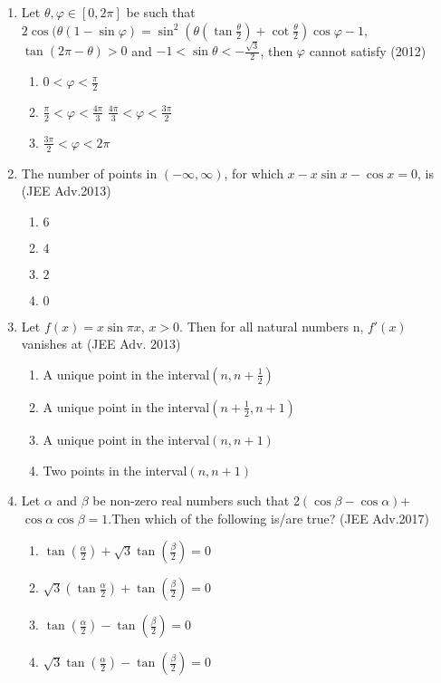 \documentclass[journal,12pt,twocolumn]{IEEEtran}
\theoremstyle{remark}
\begin{document}
\begin{enumerate}
\item Let $\theta, \varphi \in [0,2\pi]$ be such that $2 \cos(\theta(1-\sin \varphi)= 
\sin^2(\theta(\tan\frac{\theta}{2})+\cot\frac{\theta}{2})\cos \varphi-1$,$\tan(2\pi-\theta)>0$ and $-1<\sin{\theta}<-\frac{\sqrt{3}}{2}$, then $\varphi$ cannot satisfy \hfill(2012)
\begin{enumerate}
    \item $0<\varphi<\frac{\pi}{2}$
    \item $\frac{\pi}{2}<\varphi<\frac{4\pi}{3}$
    \iem $\frac{4\pi}{3}<\varphi<\frac{3\pi}{2}$
    \item $\frac{3\pi}{2}<\varphi<2\pi$
\end{enumerate}
\item The number of points in $(-\infty, \infty)$, for which $x - x \sin x - \cos x = 0$, is \hfill(JEE Adv.2013)
\begin{enumerate}
    \item $6$
    \item $4$
    \item $2$
    \item $0$
\end{enumerate}
\item Let $f(x)=x\sin\pi x $, $ x>0 $. Then for all  natural numbers n, \( f'{(x)} \) vanishes at 
\hfill(JEE Adv. 2013)
\begin{enumerate}
    \item A unique point in the interval$(n,n+\frac{1}{2})$
    \item A unique point in the interval$(n+\frac{1}{2},n+1)$
    \item A unique point in the interval$(n,n+1)$
    \item Two points in the interval$(n,n+1)$
\end{enumerate}
\item Let $\alpha$ and $\beta$ be non-zero real numbers such that 2$(\cos \beta - \cos \alpha)$+$\cos \alpha \cos \beta=1$.Then which of the following is/are true? \hfill(JEE Adv.2017)
\begin{enumerate}
    \item $\tan{(\frac{\alpha}{2})+\sqrt{3}\tan(\frac{\beta}{2})}=0$
    \item $\sqrt{3}(\tan{\frac{\alpha}{2}})+\tan({\frac{\beta}{2}})=0$
    \item $\tan{(\frac{\alpha}{2})}-\tan{(\frac{\beta}{2})}=0$
    \item $\sqrt{3}\tan{(\frac{\alpha}{2})}-\tan{(\frac{\beta}{2})}=0$
\end{enumerate}
\end{enumerate}
\end{document}
